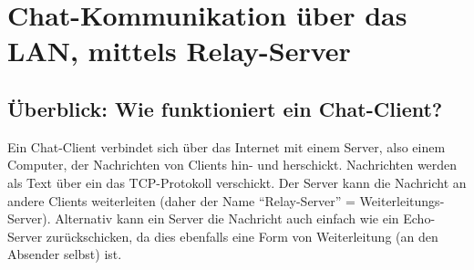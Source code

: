 \section{Chat-Kommunikation über das LAN, mittels Relay-Server}




\subsection{Überblick: Wie funktioniert ein Chat-Client?}

Ein Chat-Client verbindet sich über das Internet mit einem Server, also einem Computer, der Nachrichten von Clients hin- und herschickt. Nachrichten werden als Text über ein das \gls{TCP}-Protokoll verschickt. Der Server kann die Nachricht an andere Clients weiterleiten (daher der Name \enquote{Relay-Server} = Weiterleitungs-Server). Alternativ kann ein Server die Nachricht auch einfach wie ein Echo-Server zurückschicken, da dies ebenfalls eine Form von Weiterleitung (an den Absender selbst) ist.

